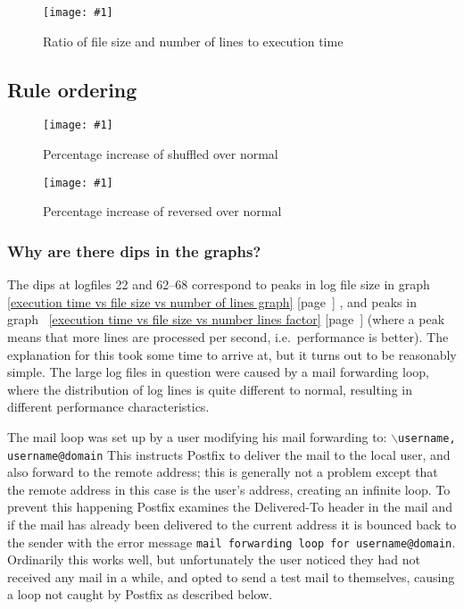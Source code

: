 \documentclass[a4paper,12pt,draft]{article}
\newcommand{\showgraph}[3]{
    \begin{figure}[hbt!]
        \caption{#2}\label{#3}
        \texttt{[image: \#1]}
    \end{figure}
}
\newcommand{\refwithpage}[1]{%
    \empty{}\ref{#1} [page~\pageref{#1}]%
}
\begin{document}
\showgraph{build/plot-normal-filesize-numlines-factor.ps}{Ratio of file
size and number of lines to execution time}{execution time vs file size vs
number lines factor}



\clearpage

\subsection{Rule ordering}

\label{rule ordering graphs}

\showgraph{build/plot-normal-shuffle-factor.ps}{Percentage increase of
shuffled over normal}{percentage increase of shuffled over normal}

\showgraph{build/plot-normal-reverse-factor.ps}{Percentage increase of
reversed over normal}{percentage increase of reversed over normal}

\subsubsection{Why are there dips in the graphs?}
\label{Why are there dips in the graphs?}

The dips at logfiles 22 and 62--68 correspond to peaks in log file size in
graph~\refwithpage{execution time vs file size vs number of lines graph},
and peaks in graph~\refwithpage{execution time vs file size vs number lines
factor} (where a peak means that more lines are processed per second, i.e.\
performance is better).  The explanation for this took some time to arrive
at, but it turns out to be reasonably simple.  The large log files in
question were caused by a mail forwarding loop, where the distribution of
log lines is quite different to normal, resulting in different performance
characteristics.

The mail loop was set up by a user modifying his mail forwarding to:
\newline \hspace*{2em}\texttt{$\backslash$username, username@domain}
\newline This instructs Postfix to deliver the mail to the local user, and
also forward to the remote address; this is generally not a problem except
that the remote address in this case is the user's address, creating an
infinite loop.  To prevent this happening Postfix examines the Delivered-To
header in the mail and if the mail has already been delivered to the
current address it is bounced back to the sender with the error message
\texttt{mail forwarding loop for username@domain}.  Ordinarily this works
well, but unfortunately the user noticed they had not received any mail in
a while, and opted to send a test mail to themselves, causing a loop not
caught by Postfix as described below.
\end{document}
